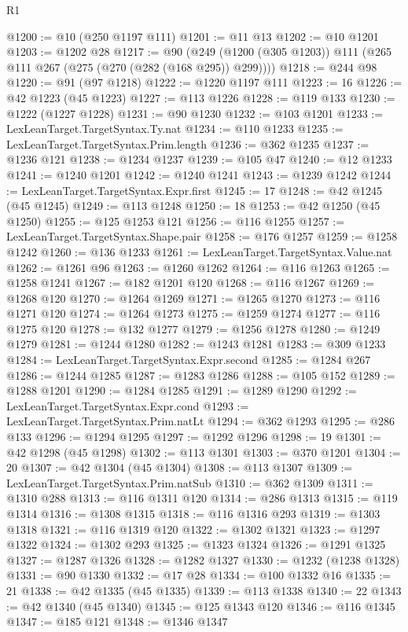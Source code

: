 \begin{lexlean}{R1}
\begin{coremodule}
@1200 := @10 (@250 @1197 @111)
@1201 := @11 @13
@1202 := @10 @1201
@1203 := @1202 @28
@1217 := @90 (@249 (@1200 (@305 @1203)) @111 (@265 @111 @267 (@275 (@270 (@282 (@168 @295)) @299))))
@1218 := @244 @98
@1220 := @91 (@97 @1218)
@1222 := @1220 @1197 @111
@1223 := 16
@1226 := @42 @1223 (@45 @1223)
@1227 := @113 @1226
@1228 := @119 @133
@1230 := @1222 (@1227 @1228)
@1231 := @90 @1230
@1232 := @103 @1201
@1233 := LexLeanTarget.TargetSyntax.Ty.nat
@1234 := @110 @1233
@1235 := LexLeanTarget.TargetSyntax.Prim.length
@1236 := @362 @1235
@1237 := @1236 @121
@1238 := @1234 @1237
@1239 := @105 @47
@1240 := @12 @1233
@1241 := @1240 @1201
@1242 := @1240 @1241
@1243 := @1239 @1242
@1244 := LexLeanTarget.TargetSyntax.Expr.first
@1245 := 17
@1248 := @42 @1245 (@45 @1245)
@1249 := @113 @1248
@1250 := 18
@1253 := @42 @1250 (@45 @1250)
@1255 := @125 @1253 @121
@1256 := @116 @1255
@1257 := LexLeanTarget.TargetSyntax.Shape.pair
@1258 := @176 @1257
@1259 := @1258 @1242
@1260 := @136 @1233
@1261 := LexLeanTarget.TargetSyntax.Value.nat
@1262 := @1261 @96
@1263 := @1260 @1262
@1264 := @116 @1263
@1265 := @1258 @1241
@1267 := @182 @1201 @120
@1268 := @116 @1267
@1269 := @1268 @120
@1270 := @1264 @1269
@1271 := @1265 @1270
@1273 := @116 @1271 @120
@1274 := @1264 @1273
@1275 := @1259 @1274
@1277 := @116 @1275 @120
@1278 := @132 @1277
@1279 := @1256 @1278
@1280 := @1249 @1279
@1281 := @1244 @1280
@1282 := @1243 @1281
@1283 := @309 @1233
@1284 := LexLeanTarget.TargetSyntax.Expr.second
@1285 := @1284 @267
@1286 := @1244 @1285
@1287 := @1283 @1286
@1288 := @105 @152
@1289 := @1288 @1201
@1290 := @1284 @1285
@1291 := @1289 @1290
@1292 := LexLeanTarget.TargetSyntax.Expr.cond
@1293 := LexLeanTarget.TargetSyntax.Prim.natLt
@1294 := @362 @1293
@1295 := @286 @133
@1296 := @1294 @1295
@1297 := @1292 @1296
@1298 := 19
@1301 := @42 @1298 (@45 @1298)
@1302 := @113 @1301
@1303 := @370 @1201
@1304 := 20
@1307 := @42 @1304 (@45 @1304)
@1308 := @113 @1307
@1309 := LexLeanTarget.TargetSyntax.Prim.natSub
@1310 := @362 @1309
@1311 := @1310 @288
@1313 := @116 @1311 @120
@1314 := @286 @1313
@1315 := @119 @1314
@1316 := @1308 @1315
@1318 := @116 @1316 @293
@1319 := @1303 @1318
@1321 := @116 @1319 @120
@1322 := @1302 @1321
@1323 := @1297 @1322
@1324 := @1302 @293
@1325 := @1323 @1324
@1326 := @1291 @1325
@1327 := @1287 @1326
@1328 := @1282 @1327
@1330 := @1232 (@1238 @1328)
@1331 := @90 @1330
@1332 := @17 @28
@1334 := @100 @1332 @16
@1335 := 21
@1338 := @42 @1335 (@45 @1335)
@1339 := @113 @1338
@1340 := 22
@1343 := @42 @1340 (@45 @1340)
@1345 := @125 @1343 @120
@1346 := @116 @1345
@1347 := @185 @121
@1348 := @1346 @1347

\end{coremodule}
\end{lexlean}
